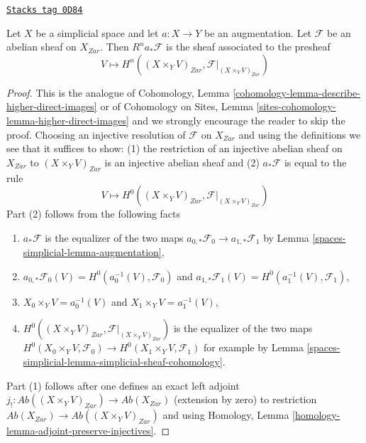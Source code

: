 \begin{lemma}
\label{spaces-simplicial-lemma-augmentation-pushforward-higher-direct-image}
\href{https://stacks.math.columbia.edu/tag/0D84}{\texttt{Stacks tag 0D84}}

Let $X$ be a simplicial space and let $a : X \to Y$
be an augmentation. Let $\mathcal{F}$ be an abelian sheaf
on $X_{Zar}$. Then $R^na_*\mathcal{F}$ is the sheaf associated
to the presheaf
$$
V \longmapsto H^n((X \times_Y V)_{Zar}, \mathcal{F}|_{(X \times_Y V)_{Zar}})
$$
\end{lemma}

\begin{proof}
This is the analogue of
Cohomology, Lemma \ref{cohomology-lemma-describe-higher-direct-images} or of
Cohomology on Sites, Lemma \ref{sites-cohomology-lemma-higher-direct-images}
and we strongly encourage the reader to skip the proof.
Choosing an injective resolution of $\mathcal{F}$ on
$X_{Zar}$ and using the definitions we see that it suffices to show:
(1) the restriction of an injective abelian
sheaf on $X_{Zar}$ to $(X \times_Y V)_{Zar}$ is an injective abelian sheaf and
(2) $a_*\mathcal{F}$ is equal to the rule
$$
V \longmapsto H^0((X \times_Y V)_{Zar}, \mathcal{F}|_{(X \times_Y V)_{Zar}})
$$
Part (2) follows from the following facts
\begin{enumerate}
\item[(2a)] $a_*\mathcal{F}$ is the equalizer of the two maps
$a_{0, *}\mathcal{F}_0 \to a_{1, *}\mathcal{F}_1$
by Lemma \ref{spaces-simplicial-lemma-augmentation},
\item[(2b)] $a_{0, *}\mathcal{F}_0(V) =
H^0(a_0^{-1}(V), \mathcal{F}_0)$ and
$a_{1, *}\mathcal{F}_1(V) = H^0(a_1^{-1}(V), \mathcal{F}_1)$,
\item[(2c)] $X_0 \times_Y V = a_0^{-1}(V)$ and $X_1 \times_Y V = a_1^{-1}(V)$,
\item[(2d)] $H^0((X \times_Y V)_{Zar}, \mathcal{F}|_{(X \times_Y V)_{Zar}})$
is the equalizer of the two maps
$H^0(X_0 \times_Y V, \mathcal{F}_0) \to H^0(X_1 \times_Y V, \mathcal{F}_1)$
for example by Lemma \ref{spaces-simplicial-lemma-simplicial-sheaf-cohomology}.
\end{enumerate}
Part (1) follows after one defines an exact left adjoint
$j_! : \textit{Ab}((X \times_Y V)_{Zar}) \to \textit{Ab}(X_{Zar})$
(extension by zero) to restriction
$\textit{Ab}(X_{Zar}) \to \textit{Ab}((X \times_Y V)_{Zar})$
and using Homology, Lemma \ref{homology-lemma-adjoint-preserve-injectives}.
\end{proof}

